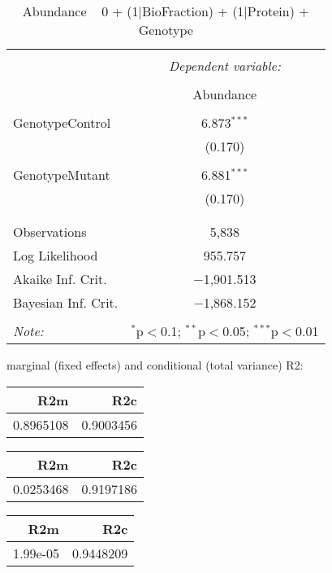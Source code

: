 \documentclass[11pt]{report}
\begin{document}
\begin{table}[!htbp] \centering 
  \caption{Abundance ~ 0 + (1|BioFraction) + (1|Protein) + Genotype} 
  \label{} 
\begin{tabular}{@{\extracolsep{5pt}}lc} 
\\[-1.8ex]\hline 
\hline \\[-1.8ex] 
 & \multicolumn{1}{c}{\textit{Dependent variable:}} \\ 
\cline{2-2} 
\\[-1.8ex] & Abundance \\ 
\hline \\[-1.8ex] 
 GenotypeControl & 6.873$^{***}$ \\ 
  & (0.170) \\ 
  & \\ 
 GenotypeMutant & 6.881$^{***}$ \\ 
  & (0.170) \\ 
  & \\ 
\hline \\[-1.8ex] 
Observations & 5,838 \\ 
Log Likelihood & 955.757 \\ 
Akaike Inf. Crit. & $-$1,901.513 \\ 
Bayesian Inf. Crit. & $-$1,868.152 \\ 
\hline 
\hline \\[-1.8ex] 
\textit{Note:}  & \multicolumn{1}{r}{$^{*}$p$<$0.1; $^{**}$p$<$0.05; $^{***}$p$<$0.01} \\ 
\end{tabular} 
\end{table} 
marginal (fixed effects) and conditional (total variance) R2:

\begin{tabular}{r|r}
\hline
R2m & R2c\\
\hline
0.8965108 & 0.9003456\\
\hline
\end{tabular}

\begin{tabular}{r|r}
\hline
R2m & R2c\\
\hline
0.0253468 & 0.9197186\\
\hline
\end{tabular}

\begin{tabular}{r|r}
\hline
R2m & R2c\\
\hline
1.99e-05 & 0.9448209\\
\hline
\end{tabular}
\end{document}
